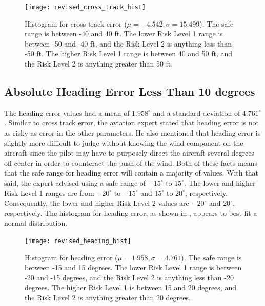 		\begin{figure}[t]
			\centering
            \texttt{[image: revised\_cross\_track\_hist]}
            \caption{Histogram for cross track error ($\mu = -4.542, \sigma = 15.499$).  The safe range is between -40 and 40 ft.  The lower Risk Level 1 range is between -50 and -40 ft, and the Risk Level 2 is anything less than -50 ft.  The higher Risk Level 1 range is between 40 and 50 ft, and the Risk Level 2 is anything greater than 50 ft.}
            \label{fig:revised_cross_track_hist}
		\end{figure}



    \subsection{Absolute Heading Error Less Than 10 degrees}
    
    	The heading error values had a mean of $1.958^\circ$ and a standard deviation of $4.761^\circ$.  Similar to cross track error, the aviation expert stated that heading error is not as risky as error in the other parameters.  He also mentioned that heading error is slightly more difficult to judge without knowing the wind component on the aircraft since the pilot may have to purposely direct the aircraft several degrees off-center in order to counteract the push of the wind.  Both of these facts means that the safe range for heading error will contain a majority of values.  With that said, the expert advised using a safe range of $-15^\circ$ to $15^\circ$.  The lower and higher Risk Level 1 ranges are from $-20^\circ$ to $-15^\circ$ and $15^\circ$ to $20^\circ$, respectively.  Consequently, the lower and higher Risk Level 2 values are $-20^\circ$ and $20^\circ$, respectively.  The histogram for heading error, as shown in , appears to best fit a normal distribution.
        
        \begin{figure}
			\centering
            \texttt{[image: revised\_heading\_hist]}
            \caption{Histogram for heading error ($\mu = 1.958, \sigma = 4.761$).  The safe range is between -15 and 15 degrees.  The lower Risk Level 1 range is between -20 and -15 degrees, and the Risk Level 2 is anything less than -20 degrees.  The higher Risk Level 1 is between 15 and 20 degrees, and the Risk Level 2 is anything greater than 20 degrees.}
            \label{fig:revised_heading_hist}
		\end{figure}
        
